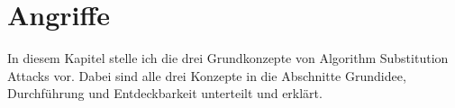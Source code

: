 \chapter{Angriffe}
\label{ch:Angriffe}

In diesem Kapitel stelle ich die drei Grundkonzepte von Algorithm Substitution Attacks vor. Dabei sind alle drei Konzepte in die Abschnitte Grundidee, Durchführung und Entdeckbarkeit unterteilt und erklärt. 



